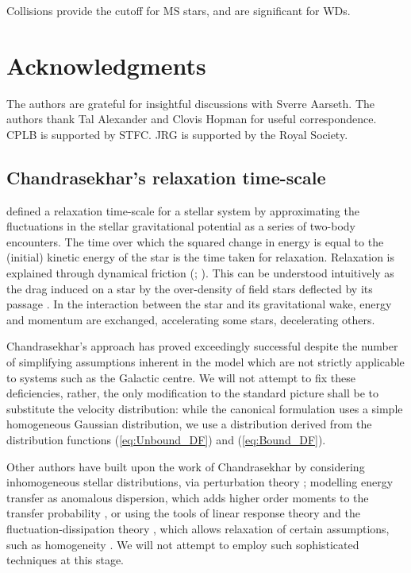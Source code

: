 \documentclass[useAMS,usedcolumn,usegraphicx,usenatbib]{mn2e}
\newcommand{\eqnref}[1]{(\ref{eq:#1})}
\begin{document}
Collisions provide the cutoff for MS stars, and are significant for WDs.


\section*{Acknowledgments}
The authors are grateful for insightful discussions with Sverre Aarseth. The authors thank Tal Alexander and Clovis Hopman for useful correspondence. CPLB is supported by STFC. JRG is supported by the Royal Society.




\appendix

\begin{onecolumn}

\section{Chandrasekhar's relaxation time-scale}\label{sec:time-scale}

\citet[chapter 2]{Chandrasekhar1960} defined a relaxation time-scale for a stellar system by approximating the fluctuations in the stellar gravitational potential as a series of two-body encounters. The time over which the squared change in energy is equal to the (initial) kinetic energy of the star is the time taken for relaxation. Relaxation is explained through dynamical friction (\citealt{Chandrasekhar1943a}; \citealt[section 1.2]{Binney2008}). This can be understood intuitively as the drag induced on a star by the over-density of field stars deflected by its passage \citep{Mulder1983}. In the interaction between the star and its gravitational wake, energy and momentum are exchanged, accelerating some stars, decelerating others.

Chandrasekhar's approach has proved exceedingly successful despite the number of simplifying assumptions inherent in the model which are not strictly applicable to systems such as the Galactic centre. We will not attempt to fix these deficiencies, rather, the only modification to the standard picture shall be to substitute the velocity distribution: while the canonical formulation uses a simple homogeneous Gaussian distribution, we use a distribution derived from the distribution functions \eqnref{Unbound_DF} and \eqnref{Bound_DF}.

Other authors have built upon the work of Chandrasekhar by considering inhomogeneous stellar distributions, via perturbation theory \citep{Lynden-Bell1972,Tremaine1984,Weinberg1986}; modelling energy transfer as anomalous dispersion, which adds higher order moments to the transfer probability \citep{Bar-Or2012}, or using the tools of linear response theory and the fluctuation-dissipation theory \citep[chapter 7]{Landau1958}, which allows relaxation of certain assumptions, such as homogeneity \citep{Bekenstein1992,Maoz1993,Nelson1999}. We will not attempt to employ such sophisticated techniques at this stage.


\end{onecolumn}
\end{document}
